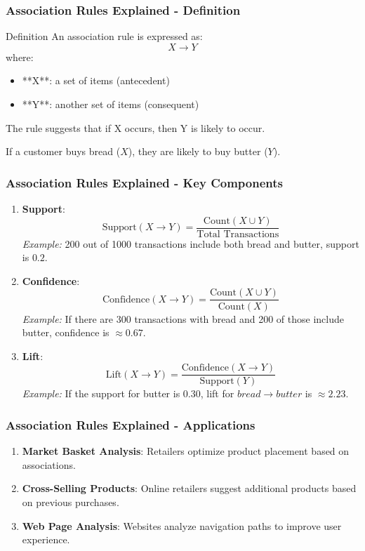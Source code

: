 \documentclass[aspectratio=169]{beamer}
\begin{document}
\begin{frame}[fragile]
    \frametitle{Association Rules Explained - Definition}
    \begin{block}{Definition}
        An association rule is expressed as:
        \[
        X \rightarrow Y
        \]
        where:
        \begin{itemize}
            \item **X**: a set of items (antecedent)
            \item **Y**: another set of items (consequent)
        \end{itemize}
        The rule suggests that if X occurs, then Y is likely to occur.
    \end{block}
    \begin{example}
        If a customer buys bread (\(X\)), they are likely to buy butter (\(Y\)).
    \end{example}
\end{frame}

\begin{frame}[fragile]
    \frametitle{Association Rules Explained - Key Components}
    \begin{enumerate}
        \item \textbf{Support}:
        \[
        \text{Support}(X \rightarrow Y) = \frac{\text{Count}(X \cup Y)}{\text{Total Transactions}}
        \]
        \textit{Example:} 200 out of 1000 transactions include both bread and butter, support is \(0.2\).

        \item \textbf{Confidence}:
        \[
        \text{Confidence}(X \rightarrow Y) = \frac{\text{Count}(X \cup Y)}{\text{Count}(X)}
        \]
        \textit{Example:} If there are 300 transactions with bread and 200 of those include butter, confidence is \(\approx 0.67\).

        \item \textbf{Lift}:
        \[
        \text{Lift}(X \rightarrow Y) = \frac{\text{Confidence}(X \rightarrow Y)}{\text{Support}(Y)}
        \]
        \textit{Example:} If the support for butter is 0.30, lift for \(bread \rightarrow butter\) is \(\approx 2.23\).
    \end{enumerate}
\end{frame}

\begin{frame}[fragile]
    \frametitle{Association Rules Explained - Applications}
    \begin{enumerate}
        \item \textbf{Market Basket Analysis}:
        Retailers optimize product placement based on associations.
        
        \item \textbf{Cross-Selling Products}:
        Online retailers suggest additional products based on previous purchases.

        \item \textbf{Web Page Analysis}:
        Websites analyze navigation paths to improve user experience.
    \end{enumerate}
\end{frame}
\end{document}
